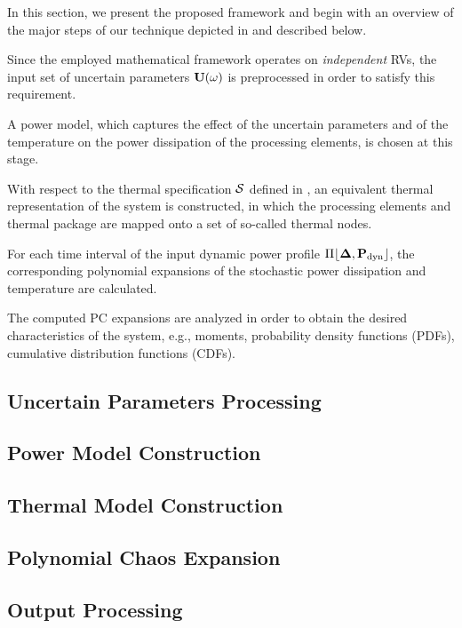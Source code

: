 In this section, we present the proposed framework and begin with an overview of the major steps of our technique depicted in  and described below.

 Since the employed mathematical framework operates on \emph{independent} RVs, the input set of uncertain parameters $\mathbf{U}(\omega)$ is preprocessed in order to satisfy this requirement.

 A power model, which captures the effect of the uncertain parameters and of the temperature on the power dissipation of the processing elements, is chosen at this stage.

 With respect to the thermal specification $\mathcal{S}$ defined in , an equivalent thermal representation of the system is constructed, in which the processing elements and thermal package are mapped onto a set of so-called thermal nodes.

 For each time interval of the input dynamic power profile $\profPdyn$, the corresponding polynomial expansions of the stochastic power dissipation and temperature are calculated.

 The computed PC expansions are analyzed in order to obtain the desired characteristics of the system, e.g., moments, probability density functions (PDFs), cumulative distribution functions (CDFs).

\subsection{Uncertain Parameters Processing} 


\subsection{Power Model Construction} 


\subsection{Thermal Model Construction} 


\subsection{Polynomial Chaos Expansion} 


\subsection{Output Processing} 

